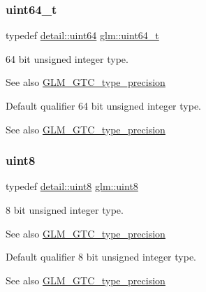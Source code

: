 \subsubsection{\texorpdfstring{uint64\+\_\+t}{uint64\_t}}
{\footnotesize\ttfamily typedef \hyperlink{namespaceglm_1_1detail_adec4b19bf4982125e122db2fe03c5810}{detail\+::uint64} \hyperlink{group__gtc__type__precision_ga058f57c19e1befdcf12498944bd73e69}{glm\+::uint64\+\_\+t}}

64 bit unsigned integer type. \begin{DoxySeeAlso}{See also}
\hyperlink{group__gtc__type__precision}{G\+L\+M\+\_\+\+G\+T\+C\+\_\+type\+\_\+precision}
\end{DoxySeeAlso}
Default qualifier 64 bit unsigned integer type. \begin{DoxySeeAlso}{See also}
\hyperlink{group__gtc__type__precision}{G\+L\+M\+\_\+\+G\+T\+C\+\_\+type\+\_\+precision} 
\end{DoxySeeAlso}
\mbox{\label{group__gtc__type__precision_ga1a7dcd8aac97cc8020817c94049deff2}} 
\subsubsection{\texorpdfstring{uint8}{uint8}}
{\footnotesize\ttfamily typedef \hyperlink{namespaceglm_1_1detail_aef2588f97d090cc19fbbe0c74fe17c8f}{detail\+::uint8} \hyperlink{group__gtc__type__precision_ga1a7dcd8aac97cc8020817c94049deff2}{glm\+::uint8}}

8 bit unsigned integer type. \begin{DoxySeeAlso}{See also}
\hyperlink{group__gtc__type__precision}{G\+L\+M\+\_\+\+G\+T\+C\+\_\+type\+\_\+precision}
\end{DoxySeeAlso}
Default qualifier 8 bit unsigned integer type. \begin{DoxySeeAlso}{See also}
\hyperlink{group__gtc__type__precision}{G\+L\+M\+\_\+\+G\+T\+C\+\_\+type\+\_\+precision} 
\end{DoxySeeAlso}
\mbox{\label{group__gtc__type__precision_ga93adf6dd9803408f3e3aaf9dedda352b}} 
